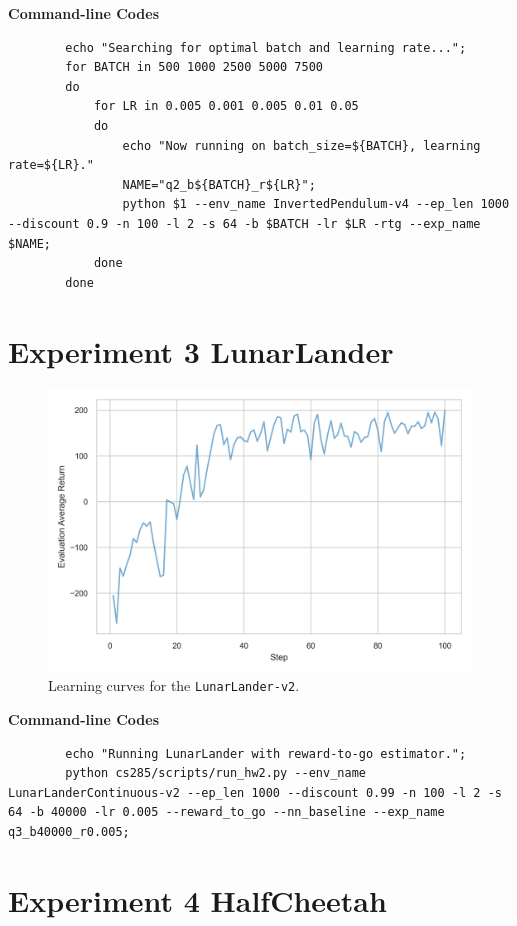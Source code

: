 \documentclass[10pt, letterpaper]{article}
\begin{document}
    \textbf{Command-line Codes}
    \begin{lstlisting}
        echo "Searching for optimal batch and learning rate...";
        for BATCH in 500 1000 2500 5000 7500 
        do
            for LR in 0.005 0.001 0.005 0.01 0.05
            do
                echo "Now running on batch_size=${BATCH}, learning rate=${LR}."
                NAME="q2_b${BATCH}_r${LR}";
                python $1 --env_name InvertedPendulum-v4 --ep_len 1000 --discount 0.9 -n 100 -l 2 -s 64 -b $BATCH -lr $LR -rtg --exp_name $NAME;
            done
        done
    \end{lstlisting}

    \newpage
    \section*{Experiment 3 LunarLander}

    \begin{figure}[thbp]
        \centering
        \includegraphics[width=\textwidth]{exp_03.png}
        \caption{Learning curves for the \texttt{LunarLander-v2}.}
        \label{fig:3}
    \end{figure}

    \textbf{Command-line Codes}
    \begin{lstlisting}
        echo "Running LunarLander with reward-to-go estimator.";
        python cs285/scripts/run_hw2.py --env_name LunarLanderContinuous-v2 --ep_len 1000 --discount 0.99 -n 100 -l 2 -s 64 -b 40000 -lr 0.005 --reward_to_go --nn_baseline --exp_name q3_b40000_r0.005;
    \end{lstlisting}

    \newpage
    \section*{Experiment 4 HalfCheetah}
\end{document}
